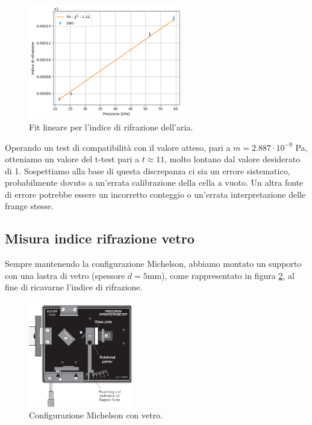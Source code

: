 \documentclass[letterpaper,12pt]{article}
\begin{document}
\begin{figure}[h!]
    \centering
    \includegraphics[width=0.6\textwidth]{fit_m_aria.png}
    \caption{Fit lineare per l'indice di rifrazione dell'aria.}
    \label{fig:m_aria}
\end{figure}

Operando un test di compatibilità con il valore atteso, pari a $m = 2.887 \cdot 10^{-9}$ Pa, otteniamo un valore del
t-test pari a $t \approx 11$, molto lontano dal valore desiderato di 1.
Sospettiamo alla base di questa discrepanza ci sia un errore sistematico, probabilmente dovuto a un'errata calibrazione
della cella a vuoto.
Un altra fonte di errore potrebbe essere un incorretto conteggio o un'errata interpretazione delle frange stesse.\\


\subsection{Misura indice rifrazione vetro}
Sempre mantenendo la configurazione Michelson, abbiamo montato un supporto con una lastra di vetro (spessore $d= 5\text{mm}$), come rappresentato in figura \ref{fig:michelson_vetro},
al fine di ricavarne l'indice di rifrazione.
\begin{figure}[h!]
    \centering
    \includegraphics[width=0.4\textwidth]{Michelson_vetro.png}
    \caption{Configurazione Michelson con vetro.}
    \label{fig:michelson_vetro}
\end{figure}
\end{document}
